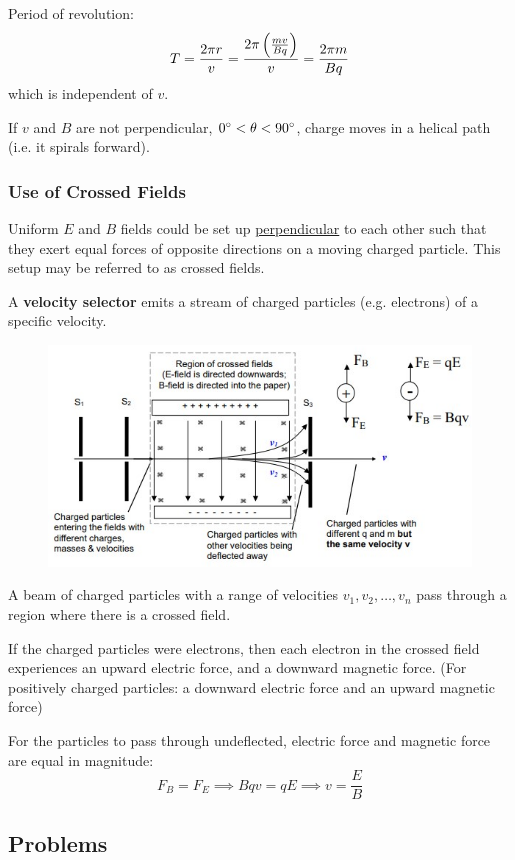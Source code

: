 Period of revolution:
\[ T=\frac{2\pi r}{v} = \frac{2\pi\left(\frac{mv}{Bq}\right)}{v} = \frac{2\pi m}{Bq} \] which is independent of $v$.

If $v$ and $B$ are not perpendicular, $0\degree < \theta < 90\degree$, charge moves in a helical path (i.e. it spirals forward).


\pagebreak

\subsubsection{Use of Crossed Fields}
Uniform $E$ and $B$ fields could be set up \underline{perpendicular} to each other such that they exert equal forces of opposite directions on a moving charged particle. This setup may be referred to as crossed fields.

A \textbf{velocity selector} emits a stream of charged particles (e.g. electrons) of a specific velocity.

\begin{figure}[H]
    \centering
    \includegraphics[width=14cm]{images/cross_fields.jpg}
\end{figure}

A beam of charged particles with a range of velocities $v_1,v_2,\dots,v_n$ pass through a region where there is a crossed field.

If the charged particles were electrons, then each electron in the crossed field experiences an upward electric force, and a downward magnetic force. (For positively charged particles: a downward electric force and an upward magnetic force)

For the particles to pass through undeflected, electric force and magnetic force are equal in magnitude:
\[ F_B = F_E \implies Bqv = qE \implies \boxed{v=\frac{E}{B}} \]
\pagebreak

\subsection*{Problems}


\pagebreak